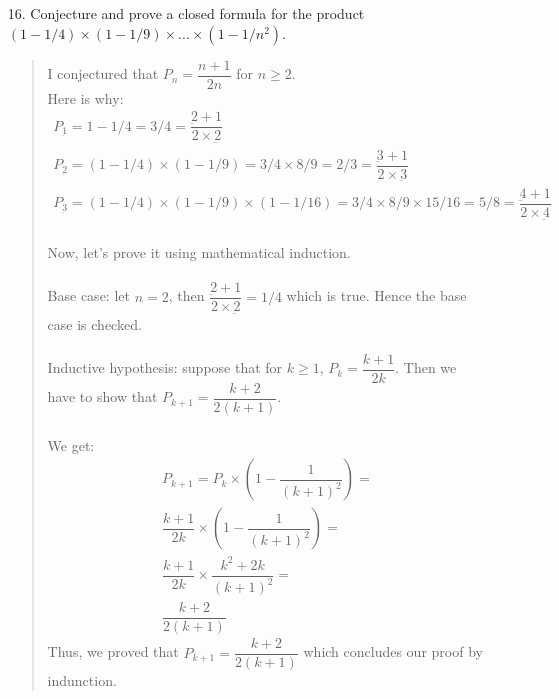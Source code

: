 \documentclass[12pt, a4paper]{article}                      %
\begin{document}
\begin{itemize}
\item[]

\item[16.]
Conjecture and prove a closed formula for the product $(1 - 1/4) \times (1 - 1/9) \times ... \times (1 - 1/n^2)$.
\begin{quote}
I conjectured that $P_n = \dfrac{n + 1}{2n}$ for $n \geq 2$.\\
Here is why:\\
\begin{align*}
P_{\underbar 1} = 1 - 1/4 = 3/4 = \dfrac{\underbar 2 + 1}{2 \times \underbar 2}\\
P_{\underbar 2} = (1 - 1/4) \times (1 - 1/9) = 3/4 \times 8/9 = 2/3 = \dfrac{\underbar 3 + 1}{2 \times \underbar 3}\\
P_{\underbar 3} = (1 - 1/4) \times (1 - 1/9) \times (1 - 1/16) = 3/4 \times 8/9 \times 15/16 = 5/8 = \dfrac{\underbar 4 + 1}{2 \times \underbar 4}\\
\end{align*}

Now, let's prove it using mathematical induction.\\\\
Base case: let $n = 2$, then $\dfrac{\underbar 2 + 1}{2 \times \underbar 2} = 1/4$ which is true.
Hence the base case is checked.\\\\
Inductive hypothesis: suppose that for $k \geq 1$, $P_k = \dfrac{k + 1}{2k}$. Then we have
to show that $P_{k + 1} = \dfrac{k + 2}{2(k + 1)}$.\\\\
We get:
\begin{align*}
P_{k + 1} = P_k \times (1 - \dfrac{1}{(k + 1)^2}) =\\
\dfrac{k + 1}{2k} \times (1 - \dfrac{1}{(k + 1)^2}) =\\
\dfrac{k + 1}{2k} \times \dfrac{k^2 + 2k}{(k + 1)^2} =\\
\dfrac{k + 2}{2(k + 1)}
\end{align*}
Thus, we proved that $P_{k + 1} = \dfrac{k + 2}{2(k + 1)}$ which concludes our proof by indunction.
\end{quote}


\end{itemize}
\end{document}

